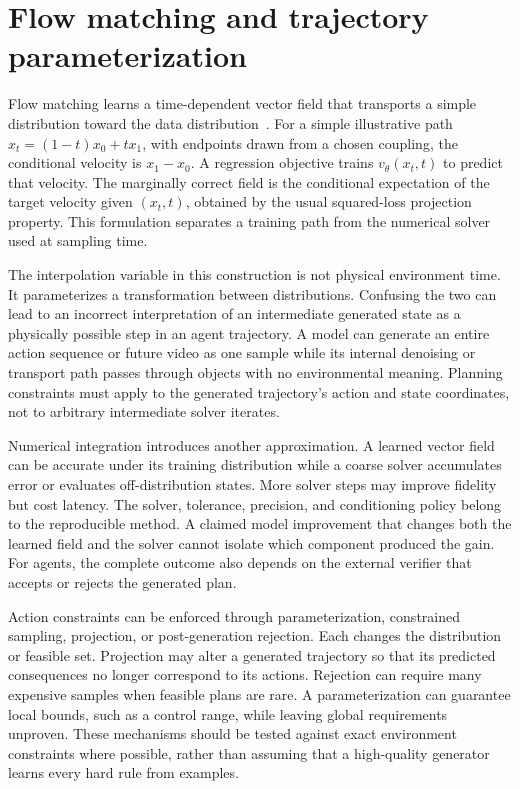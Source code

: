 \section{Flow matching and trajectory parameterization}
\label{sec:C06:flow}
Flow matching learns a time-dependent vector field that transports a simple distribution toward the data distribution~\cite{lipman2022flowmatching}. For a simple illustrative path $x_t=(1-t)x_0+tx_1$, with endpoints drawn from a chosen coupling, the conditional velocity is $x_1-x_0$. A regression objective trains $v_\theta(x_t,t)$ to predict that velocity. The marginally correct field is the conditional expectation of the target velocity given $(x_t,t)$, obtained by the usual squared-loss projection property. This formulation separates a training path from the numerical solver used at sampling time.

The interpolation variable in this construction is not physical environment time. It parameterizes a transformation between distributions. Confusing the two can lead to an incorrect interpretation of an intermediate generated state as a physically possible step in an agent trajectory. A model can generate an entire action sequence or future video as one sample while its internal denoising or transport path passes through objects with no environmental meaning. Planning constraints must apply to the generated trajectory's action and state coordinates, not to arbitrary intermediate solver iterates.

Numerical integration introduces another approximation. A learned vector field can be accurate under its training distribution while a coarse solver accumulates error or evaluates off-distribution states. More solver steps may improve fidelity but cost latency. The solver, tolerance, precision, and conditioning policy belong to the reproducible method. A claimed model improvement that changes both the learned field and the solver cannot isolate which component produced the gain. For agents, the complete outcome also depends on the external verifier that accepts or rejects the generated plan.

Action constraints can be enforced through parameterization, constrained sampling, projection, or post-generation rejection. Each changes the distribution or feasible set. Projection may alter a generated trajectory so that its predicted consequences no longer correspond to its actions. Rejection can require many expensive samples when feasible plans are rare. A parameterization can guarantee local bounds, such as a control range, while leaving global requirements unproven. These mechanisms should be tested against exact environment constraints where possible, rather than assuming that a high-quality generator learns every hard rule from examples.
